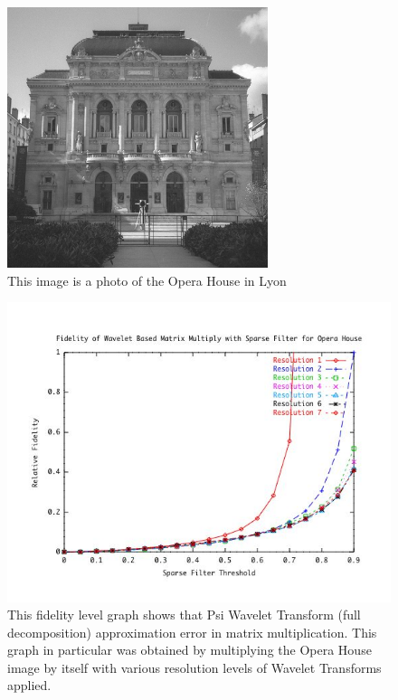 \begin{figure}
\includegraphics [width=3in] {opera.jpg}
\caption {This image is a photo of the Opera House in Lyon \cite{opera}}
\label{Opera House}
\end{figure}

\begin{figure}
\includegraphics [width=5.5in]{operaresultsA.jpg}
\caption{This fidelity level graph shows that Psi Wavelet Transform (full decomposition) approximation error in matrix multiplication.  This graph in particular was obtained by multiplying the Opera House image by itself with various resolution levels of Wavelet Transforms applied.  }
\label{image_opera_fidelity}
\end{figure}

